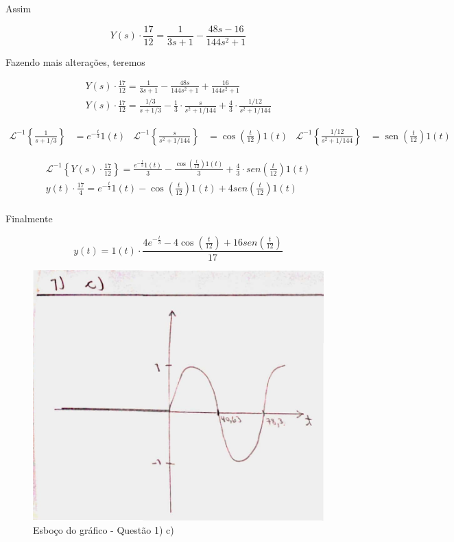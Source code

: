 \documentclass{article}
\DeclareMathOperator{\sen}{sen}
\begin{document}
Assim

\[Y(s) \cdot \frac{17}{12} = \frac{1}{3s + 1} - \frac{48s - 16}{144s^2 + 1}\]

Fazendo mais alterações, teremos

\begin{align*}
    Y(s) \cdot \frac{17}{12} = \frac{1}{3s + 1} - \frac{48s}{144s^2 + 1} + \frac{16}{144s^2 + 1}\\
    Y(s) \cdot \frac{17}{12} = \frac{1/3}{s + 1/3} - \frac{1}{3}\cdot\frac{s}{s^2 + 1/144} + \frac{4}{3}\cdot\frac{1/12}{s^2 + 1/144}
\end{align*}

\begin{align*}
    \mathcal{L}^{-1} \left\{\frac{1}{s + 1/3}\right\} &= e^{-\frac{t}{3}}1(t) & \mathcal{L}^{-1} \left\{\frac{s}{s^2 + 1/144}\right\} &= \cos\left(\frac{t}{12}\right)1(t) & \mathcal{L}^{-1} \left\{\frac{1/12}{s^2 + 1/144}\right\} &= \sen\left(\frac{t}{12}\right)1(t)
\end{align*}

\begin{align*}
    \mathcal{L}^{-1} \left\{Y(s) \cdot \frac{17}{12}\right\} = \frac{e^{-\frac{t}{3}}1(t)}{3} - \frac{\cos\left(\frac{t}{12}\right)1(t)}{3} + \frac{4}{3}\cdot sen\left(\frac{t}{12}\right)1(t)\\
    y(t) \cdot \frac{17}{4} = e^{-\frac{t}{3}}1(t) - \cos\left(\frac{t}{12}\right)1(t) + 4sen\left(\frac{t}{12}\right)1(t)\\
\end{align*}

Finalmente

\[y(t) = 1(t)\cdot\frac{4e^{-\frac{t}{3}} - 4\cos\left(\frac{t}{12}\right) + 16sen\left(\frac{t}{12}\right)}{17}\]

\begin{figure}[h!]
    \includegraphics[scale=0.25]{Q1_c.png}
    \centering
    \caption{Esboço do gráfico - Questão 1) c)}
\end{figure}
\end{document}
